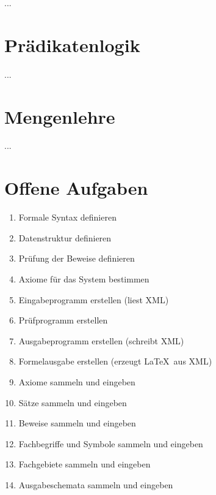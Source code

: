\documentclass[english,ngerman,parskip=half,headsepline,footsepline]{scrreprt}
\begin{document}

	\par ... %

	\section{Prädikatenlogik} %
	\label{Prädikatenlogik}

	... %

	\section{Mengenlehre} %
	\label{Mengenlehre}

	... %

	\section{Offene Aufgaben} %
	\label{Offene Aufgaben}

	\begin{enumerate}
		\item Formale Syntax definieren
		\item Datenstruktur definieren
		\item Prüfung der Beweise definieren
		\item Axiome für das System bestimmen
		\item Eingabeprogramm erstellen (liest XML)
		\item Prüfprogramm erstellen
		\item Ausgabeprogramm erstellen (schreibt XML)
		\item Formelausgabe erstellen (erzeugt \LaTeX\ aus XML)
		\item Axiome sammeln und eingeben
		\item Sätze sammeln und eingeben
		\item Beweise sammeln und eingeben
		\item Fachbegriffe und Symbole sammeln und eingeben
		\item Fachgebiete sammeln und eingeben
		\item Ausgabeschemata sammeln und eingeben
	\end{enumerate}
\end{document}
